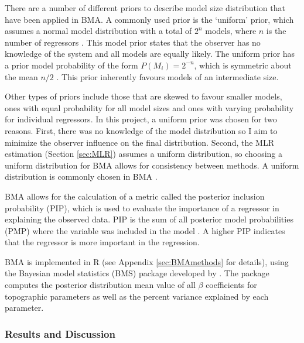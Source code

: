 \documentclass{sfuthesis}
\begin{document}
There are a number of different priors to describe model size distribution that have been applied in BMA. A commonly used prior is the `uniform' prior, which assumes a normal model distribution with a total of $2^n$ models, where $n$ is the number of regressors \citep{Wasserman2000}.  This model prior states that the observer has no knowledge of the system and all models are equally likely. The uniform prior has a prior model probability of the form $P(M_i)=2^{-n}$, which is symmetric about the mean $n/2$ \citep{Zeugner2015}. This prior inherently favours models of an intermediate size. 

Other types of priors include those that are skewed to favour smaller models, ones with equal probability for all model sizes and ones with varying probability for individual regressors. In this project, a uniform prior was chosen for two reasons. First, there was no knowledge of the model distribution so I aim to minimize the observer influence on the final distribution. Second, the MLR estimation (Section \ref{sec:MLR}) assumes a uniform distribution, so choosing a uniform distribution for BMA allows for consistency between methods. A uniform distribution is commonly chosen in BMA \citep{Wasserman2000}.

BMA allows for the calculation of a metric called the posterior inclusion probability (PIP), which is used to evaluate the importance of a regressor in explaining the observed data. PIP is the sum of all posterior model probabilities (PMP) where the variable was included in the model \citep{Zeugner2015}. A higher PIP indicates that the regressor is more important in the regression.  

BMA is implemented in R (see Appendix \ref{sec:BMAmethods} for details), using the Bayesian model statistics (BMS) package developed by \cite{Zeugner2015}. The package computes the posterior distribution mean value of all $\beta$ coefficients for topographic parameters as well as the percent variance explained by each parameter.

\subsubsection{Results and Discussion}
\end{document}
